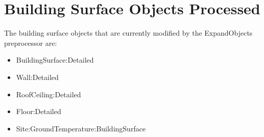 \section{Building Surface Objects Processed}\label{building-surface-objects-processed}

The building surface objects that are currently modified by the ExpandObjects preprocessor are:

\begin{itemize}
\item
  BuildingSurface:Detailed
\item
  Wall:Detailed
\item
  RoofCeiling:Detailed
\item
  Floor:Detailed
\item
  Site:GroundTemperature:BuildingSurface
\end{itemize}
